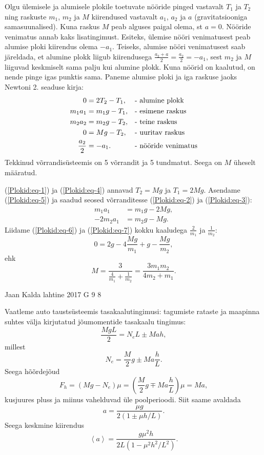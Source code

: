 \documentclass[11pt]{article}
\begin{document}
{{\ifSolution
Olgu ülemisele ja alumisele plokile toetuvate nööride pinged vastavalt $T_1$ ja $T_2$ ning raskuste $m_1$, $m_2$ ja $M$ kiirendused vastavalt $a_1$, $a_2$ ja $a$ (gravitatsiooniga samasuunalised). Kuna raskus $M$ peab alguses paigal olema, st $a = 0$. Nööride venimatus annab kaks lisatingimust. Esiteks, ülemise nööri venimatusest peab alumise ploki kiirendus olema $-a_1$. Teiseks, alumise nööri venimatusest saab järeldada, et alumine plokk liigub kiirendusega $\frac{a_2 + a}{2} = \frac{a_2}{2} = -a_1$, sest $m_2$ ja $M$ liiguvad keskmiselt sama palju kui alumine plokk. Kuna nöörid on kaalutud, on nende pinge igas punktis sama. Paneme alumise ploki ja iga raskuse jaoks Newtoni 2. seaduse kirja:
\begin{align}
0 &= 2T_2 - T_1,				& &\text{- alumine plokk}\label{Plokid:eq-1}\\
m_1a_1 &= m_1g - T_1,			& &\text{- esimene raskus}\label{Plokid:eq-2}\\
m_2a_2 &= m_2g - T_2,			& &\text{- teine raskus}\label{Plokid:eq-3}\\
0 &= Mg - T_2,					& &\text{- uuritav raskus}\label{Plokid:eq-4}\\
\frac{a_2}{2} &= -a_1.			& &\text{- nööride venimatus\label{Plokid:eq-5}}
\end{align}
Tekkinud võrrandisüsteemis on 5 võrrandit ja 5 tundmatut. Seega on $M$ üheselt määratud.

(\ref{Plokid:eq-1}) ja (\ref{Plokid:eq-4}) annavad $T_2 = Mg$ ja $T_1 = 2Mg$. Asendame (\ref{Plokid:eq-5}) ja saadud seosed võrranditesse (\ref{Plokid:eq-2}) ja (\ref{Plokid:eq-3}):
\begin{align}
m_1a_1 &= m_1g - 2Mg, \label{Plokid:eq-6}\\
-2m_2a_1 &= m_2g - Mg. \label{Plokid:eq-7}
\end{align}
Liidame (\ref{Plokid:eq-6}) ja (\ref{Plokid:eq-7}) kokku kaaludega $\frac{2}{m_1}$ ja $\frac{1}{m_2}$:
\[
0 = 2g - 4\frac{Mg}{m_1} + g - \frac{Mg}{m_2},
\]
ehk
\[
M = \frac{3}{\frac{4}{m_1} + \frac{1}{m_2}} = \frac{3m_1m_2}{4m_2 + m_1}.
\]
\fi
}

{Jaan Kalda} %
{lahtine} %
{2017} %
{G 9} %
{8} %
{

\ifSolution
Vaatleme auto taustsüsteemis tasakaalutingimusi: tagumiste rataste ja maapinna suhtes välja kirjutatud jõumomentide tasakaalu tingimus:
\[
\frac {MgL}2=N_eL\pm Mah,
\]
millest
\[
N_e=\frac M2g\pm Ma\frac hL.
\]
Seega hõõrdejõud
\[
F_h=(Mg-N_e)\mu=\left(\frac M2g\mp Ma\frac hL\right)\mu=Ma,
\]
kusjuures pluss ja miinus vahelduvad üle poolperioodi. Siit saame avaldada
\[
a=\frac{\mu g}{2(1\pm \mu h/L)}.
\]
Seega keskmine kiirendus
\[
\left< a\right>=\frac{g\mu^2h}{2L(1-\mu^2h^2/L^2)}.
\]
\fi
}

}
\end{document}
